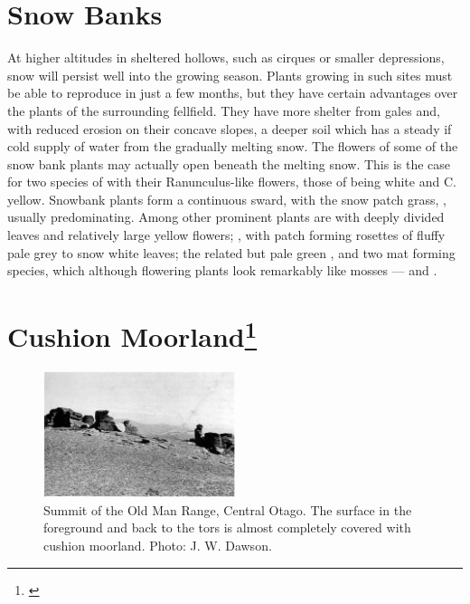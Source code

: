 \section{Snow Banks}

At higher altitudes in sheltered hollows, such as cirques or smaller depressions, snow will persist well into the growing season.
Plants growing in such sites must be able to reproduce in just a few months, but they have certain advantages over the plants of the surrounding fellfield.
They have more shelter from gales and, with reduced erosion on their concave slopes, a deeper soil which has a steady if cold supply of water from the gradually melting snow.
The flowers of some of the snow bank plants may actually open beneath the melting snow.
This is the case for two species of  with their Ranunculus-like flowers, those of   being white and C.  yellow.
Snowbank plants form a continuous sward, with the snow patch grass, , usually predominating.
Among other prominent plants are  with deeply divided leaves and relatively large yellow flowers; , with patch forming rosettes of fluffy pale grey to snow white leaves; the related but pale green , and two mat forming species, which although flowering plants look remarkably like mosses —  and .

\section[Cushion Moorland]{Cushion Moorland\footnote{\cite{mark1970high}}}

\begin{figure}
	\includegraphics[width=0.5\textwidth]{graphics/figure113summit.jpg}
	\centering
	\caption[Summit of the Old Man Range]{Summit of the Old Man Range, Central Otago.
    The surface in the foreground and back to the tors is almost completely covered with cushion moorland.
	Photo: J. W. Dawson.}
	\label{fig:113summit}
\end{figure}


